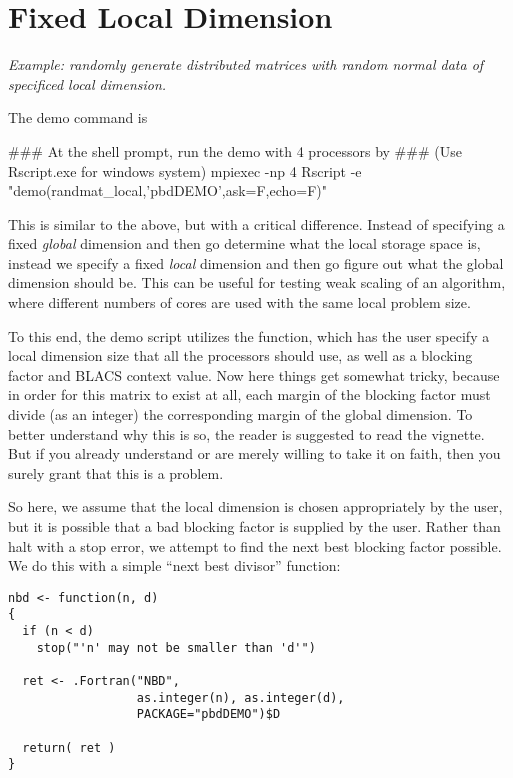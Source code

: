 \section{Fixed Local Dimension}

\emph{Example:  randomly generate distributed matrices with random normal data of specificed local dimension.}

The demo command is
\begin{Command}
### At the shell prompt, run the demo with 4 processors by
### (Use Rscript.exe for windows system)
mpiexec -np 4 Rscript -e "demo(randmat_local,'pbdDEMO',ask=F,echo=F)"
\end{Command}

This is similar to the above, but with a critical difference.  Instead of specifying a fixed \emph{global} dimension and then go determine what the local storage space is, instead we specify a fixed \emph{local} dimension and then go figure out what the global dimension should be.  This can be useful for testing weak scaling of an algorithm, where different numbers of cores are used with the same local problem size.

To this end, the demo script utilizes the  function, which has the user specify a local dimension size that all the processors should use, as well as a blocking factor and BLACS context value.  Now here things get somewhat tricky, because in order for this matrix to exist at all, each margin of the blocking factor must divide (as an integer) the corresponding margin of the global dimension.  To better understand why this is so, the reader is suggested to read the  vignette.  But if you already understand or are merely willing to take it on faith, then you surely grant that this is a problem.

So here, we assume that the local dimension is chosen appropriately by the user, but it is possible that a bad blocking factor is supplied by the user.  Rather than halt with a stop error, we attempt to find the next best blocking factor possible.  We do this with a simple ``next best divisor'' function:

\begin{lstlisting}[language=rr,title=nbd()]
nbd <- function(n, d)
{
  if (n < d)
    stop("'n' may not be smaller than 'd'")
  
  ret <- .Fortran("NBD", 
                  as.integer(n), as.integer(d),
                  PACKAGE="pbdDEMO")$D
  
  return( ret )
}
\end{lstlisting}

